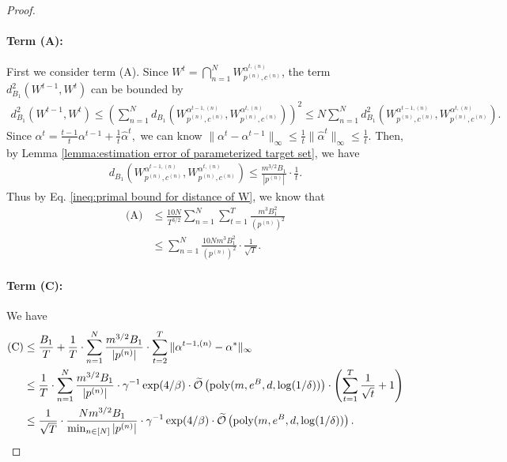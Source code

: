\begin{proof}
\paragraph{Term (A):} First we consider term (A). Since $W^{t} = \bigcap_{n=1}^N W_{p^{(n)},c^{(n)}}^{\alpha^{t,(n)}}$, the term $d_{B_1}^2(W^{t-1}, W^t)$ can be bounded by 
\begin{align*}d_{B_1}^2(W^{t-1}, W^t) \le  \left(\sum_{n=1}^Nd_{B_1}\left(W_{p^{(n)},c^{(n)}}^{\alpha^{t-1,(n)}}, W_{p^{(n)},c^{(n)}}^{\alpha^{t,(n)}}\right)\right)^2\le N\sum_{n=1}^N d^2_{B_1}\left(W_{p^{(n)},c^{(n)}}^{\alpha^{t-1,(n)}}, W_{p^{(n)},c^{(n)}}^{\alpha^{t,(n)}}\right).\end{align*} Since 
 $\alpha^t = \frac{t-1}{t}\alpha^{t-1} +\frac{1}{t}\hat{\alpha}^t,$ we can know $\|\alpha^t- \alpha^{t-1}\|_\infty \le \frac{1}{t}\|\hat{\alpha}^t\|_\infty \le \frac{1}{t}$. Then, by Lemma \ref{lemma:estimation error of parameterized target set}, we have 
 \begin{align}d_{B_1}(W^{\alpha^{t-1,(n)}}_{p^{(n)},c^{(n)}}, W^{\alpha^{t,(n)}}_{p^{(n)},c^{(n)}}) \le \frac{m^{3/2}B_1}{|p^{(n)}|}\cdot \frac{1}{t}.\label{ineq:primal bound for distance of W}\end{align}
 Thus by Eq. \eqref{ineq:primal bound for distance of W}, we know that 
 \begin{align}
     \textrm{(A)}&\le \frac{10N}{T^{3/2}}\sum_{n=1}^N \sum_{t=1}^T \frac{m^3B_1^2}{(p^{(n)})^2}\nonumber\\
     &\le \sum_{n=1}^N \frac{10Nm^3B_1^2}{(p^{(n)})^2}\cdot \frac{1}{\sqrt{T}}.\label{ineq:upperbound of (A)}
 \end{align}

 \paragraph{Term (C):}
 We have 
 \begin{align}
     \textrm{(C)}&\le \frac{B_1}{T} + \frac{1}{T}\cdot \sum_{n=1}^N\frac{m^{3/2}B_1}{|p^{(n)}|}\cdot \sum_{t=2}^T  \|\alpha^{t-1,(n)}-\alpha^*\|_\infty\nonumber\\
     &\le \frac{1}{T}\cdot \sum_{n=1}^N\frac{m^{3/2}B_1}{|p^{(n)}|}\cdot \gamma^{-1}\exp(4/\beta)\cdot \widetilde{\mathcal{O}}\left(\mathrm{poly}(m,e^B, d,\log(1/\delta))\right)\cdot \left(\sum_{t=1}^T \frac{1}{\sqrt{t}}+1\right)\nonumber\\
     &\le\frac{1}{\sqrt{T}}\cdot \frac{Nm^{3/2}B_1}{\min_{n \in [N]}|p^{(n)}|}\cdot \gamma^{-1}\exp(4/\beta)\cdot \widetilde{\mathcal{O}}\left(\mathrm{poly}(m,e^B, d,\log(1/\delta))\right). \label{ineq:(C)general: first}
 \end{align}


\end{proof}

